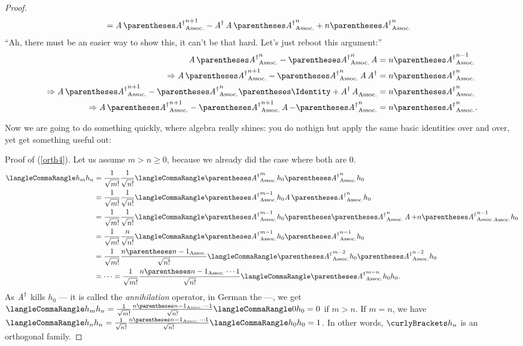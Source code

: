 \documentclass[10pt, a4paper, twoside]{lecturenotes}
\newcommand{\opAdag}{\adj{\opA}}
\begin{document}
\begin{lecture}[date=2013-03-28]
\begin{proposition}
\begin{proof}
\begin{align*}
  &= \opA \pa{\opAdag}^{n+1} - \opAdag \opA \pa{\opAdag}^n + n \pa{\opAdag}^n
\end{align*}
  ``Ah, there must be an easier way to show this, it can't be that hard. Let's just reboot this argument:''
\begin{align*}
\opA\pa{\opAdag}^n - \pa{\opAdag}^n\opA &= n \pa{\opAdag}^{n-1}\\
\Implies \opA\pa{\opAdag}^{n+1} - \pa{\opAdag}^n \opA \opAdag &= n \pa{\opAdag}^n \\
\Implies \opA \pa{\opAdag}^{n+1} - \pa{\opAdag}^n \pa{\Identity + \opAdag\opA}&= n \pa{\opAdag}^n \\
\Implies \opA \pa{\opAdag}^{n+1} - \pa{\opAdag}^{n+1} \opA - \pa{\opAdag}^{n} &= n \pa{\opAdag}^n \text.
\end{align*}

Now we are going to do something quickly, where algebra really shines: you do nothign but apply the same basic identities over and over, yet get something useful out:

Proof of (\ref{orth4}). Let us assume $m>n\geq 0$, because we already did the case where both are $0$.
\begin{align*}
\LTwoInner{h_m}{h_n} &= \frac{1}{\sqrt{\Factorial m}} \frac{1}{\sqrt{\Factorial n}} \LTwoInner{\pa{\opAdag}^{m} h_0}{\pa{\opAdag}^{n} h_0} \\
&= \frac{1}{\sqrt{\Factorial m}} \frac{1}{\sqrt{\Factorial n}}\LTwoInner{\pa{\opAdag}^{m-1} h_0}{\opA\pa{\opAdag}^{n} h_0}\\
&= \frac{1}{\sqrt{\Factorial m}} \frac{1}{\sqrt{\Factorial n}}\LTwoInner{\pa{\opAdag}^{m-1} h_0}{\pa{\pa{\opAdag}^{n}\opA + n\pa{\opAdag}^{n-1}} h_0 }\\
&= \frac{1}{\sqrt{\Factorial m}} \frac{n}{\sqrt{\Factorial n}} 
  \LTwoInner{\pa{\opAdag}^{m-1} h_0}{\pa{\opAdag}^{n-1} h_0}\\
&= \frac{1}{\sqrt{\Factorial m}} 
  \frac{n\pa{n-1}}{\sqrt{\Factorial n}} 
  \LTwoInner{\pa{\opAdag}^{m-2} h_0}{\pa{\opAdag}^{n-2} h_0}\\
  &= \dotsb = \frac{1}{\sqrt{\Factorial m}} 
  \frac{n\pa{n-1}\dotsm 1}{\sqrt{\Factorial n}} 
  \LTwoInner{\pa{\opAdag}^{m-n} h_0}{h_0}\text.
\end{align*}
As $\opAdag$ kills $h_0$ --- it is called the \emph{annihilation} operator, in German the  ---, we get $
  \LTwoInner{h_m}{h_n} =
  \frac{1}{\sqrt{\Factorial m}} 
  \frac{n\pa{n-1}\dotsm 1}{\sqrt{\Factorial n}} 
  \LTwoInner{0}{h_0}=0$ if $m>n$. If $m=n$, we have $
  \LTwoInner{h_n}{h_n} =
  \frac{1}{\sqrt{\Factorial n}} 
  \frac{n\pa{n-1}\dotsm 1}{\sqrt{\Factorial n}} 
  \LTwoInner{h_0}{h_0}=1$.  
  In other words, $\set{h_n}$ is an orthogonal family.


\end{proof}
\end{proposition}
\end{lecture}
\end{document}
